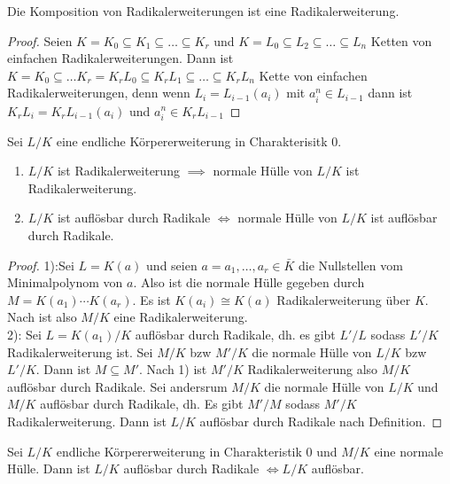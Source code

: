 \begin{Lemma}
	Die Komposition von Radikalerweiterungen ist eine Radikalerweiterung.
\end{Lemma}\label{Lem:KompRad}
\begin{proof}
	Seien \(K=K_0\subseteq K_1\subseteq \dots \subseteq K_r\) und \(K=L_0\subseteq L_2\subseteq \dots \subseteq L_n\) Ketten von einfachen Radikalerweiterungen.
	Dann ist \(K=K_0\subseteq \dots K_r=K_rL_0\subseteq K_rL_1\subseteq\dots \subseteq K_rL_n\) Kette von einfachen Radikalerweiterungen, denn wenn \(L_i=L_{i-1}(a_i)\) mit \(a_i^n\in L_{i-1}\) dann ist \(K_rL_i=K_rL_{i-1}(a_i)\) und \(a_i^n\in K_rL_{i-1}\)
\end{proof}
\begin{Lemma}\label{Lem:AuflRad}
	Sei \(L/K\) eine endliche Körpererweiterung in Charakterisitk \(0\).
	\begin{enumerate}
		\item \(L/K\) ist Radikalerweiterung \(\implies \) normale Hülle von \(L/K\) ist Radikalerweiterung.
		\item \(L/K\) ist auflösbar durch Radikale \(\iff\) normale Hülle von \(L/K\) ist auflösbar durch Radikale.
	\end{enumerate}
\end{Lemma}
\begin{proof}
	1):Sei \(L=K(a)\) und seien \(a=a_1,\dots,a_r\in\bar K\) die Nullstellen vom Minimalpolynom von \(a\). Also ist die normale Hülle gegeben durch \(M=K(a_1)\cdots K(a_r)\).
	Es ist \(K(a_i)\cong K(a)\) Radikalerweiterung über \(K\). Nach  ist also \(M/K\) eine Radikalerweiterung.\\
	2): Sei \(L=K(a_1)/K\) auflösbar durch Radikale, dh. es gibt \(L'/L\) sodass \(L'/K\) Radikalerweiterung ist. Sei \(M/K\) bzw \(M'/K\) die normale Hülle von \(L/K\) bzw \(L'/K\). Dann ist \(M\subseteq M'\). Nach 1) ist \(M'/K\) Radikalerweiterung also \(M/K\) auflösbar durch Radikale.
	Sei andersrum \(M/K\) die normale Hülle von \(L/K\) und \(M/K\) auflösbar durch Radikale, dh. Es gibt \(M'/M\) sodass \(M'/K\) Radikalerweiterung. Dann ist \(L/K\) auflösbar durch Radikale nach Definition.
\end{proof}
\begin{Satz}
	Sei \(L/K\) endliche Körpererweiterung in Charakteristik \(0\) und \(M/K\) eine normale Hülle. Dann ist \(L/K\) auflösbar durch Radikale \(\iff L/K\) auflösbar.
\end{Satz}
